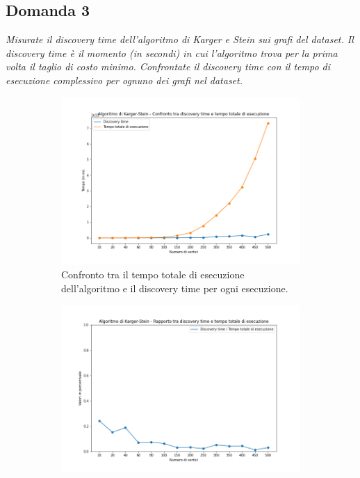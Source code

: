 \subsection{Domanda 3}
\textit{Misurate il discovery time dell'algoritmo di Karger e Stein sui grafi del dataset. Il discovery time è il momento (in secondi) in cui l'algoritmo trova per la prima volta il taglio di costo minimo.  Confrontate il discovery time con il tempo di esecuzione complessivo per ognuno dei grafi nel dataset.}

\begin{figure}[H]
	\begin{subfigure}{.5\textwidth}
		\centering
		\includegraphics[width=1\textwidth]{res/images/single/karger-stein/discovery-time/karger_stein_confronto_discovery_time_total_time.png}
		\caption{Confronto tra il tempo totale di esecuzione dell'algoritmo e il discovery time per ogni esecuzione.}
		\label{fig:karger_stein_confronto_discovery_time_total_time}
	\end{subfigure}
	\begin{subfigure}{.5\textwidth}
		\centering
		\includegraphics[width=1\textwidth]{res/images/single/karger-stein/discovery-time/karger_stein_rapporto_discovery_time_total_time.png}

\end{subfigure}
\end{figure}

